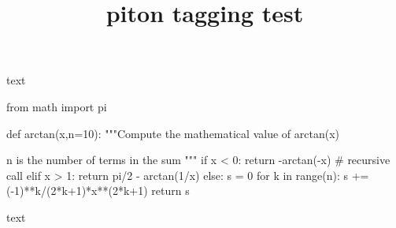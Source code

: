 \documentclass{article}
\title{piton tagging test}
\begin{document}
text
\begin{Piton}
 from math import pi

 def arctan(x,n=10):
    """Compute the mathematical value of arctan(x)

    n is the number of terms in the sum
    """
     if x < 0:
         return -arctan(-x) # recursive call
     elif x > 1: 
         return pi/2 - arctan(1/x) 
     else: 
         s = 0
         for k in range(n):
             s += (-1)**k/(2*k+1)*x**(2*k+1)
         return s 
\end{Piton}
text
\end{document}
